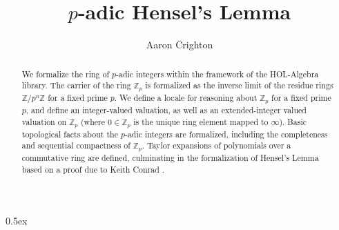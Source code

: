 \documentclass[11pt,a4paper]{article}
\begin{document}
\title{$p$-adic Hensel's Lemma}
\author{Aaron Crighton}
\maketitle

\tableofcontents

\parindent 0pt\parskip 0.5ex

\begin{abstract}
We formalize the ring of $p$-adic integers within the framework of the HOL-Algebra library. The carrier of the ring $\mathbb{Z}_p$ is formalized as the inverse limit of the residue rings $\mathbb{Z}/p^n\mathbb{Z}$ for a fixed prime $p$. We define a locale for reasoning about $\mathbb{Z}_p$ for a fixed prime $p$, and define an integer-valued valuation, as well as an extended-integer valued valuation on $\mathbb{Z}_p$ (where $0 \in \mathbb{Z}_p$ is the unique ring element mapped to $\infty$). Basic topological facts about the $p$-adic integers are formalized, including the completeness and sequential compactness of $\mathbb{Z}_p$. Taylor expansions of polynomials over a commutative ring are defined, culminating in the formalization of Hensel's Lemma based on a proof due to Keith Conrad \cite{keithconrad}. 
\end{abstract}




\end{document}
